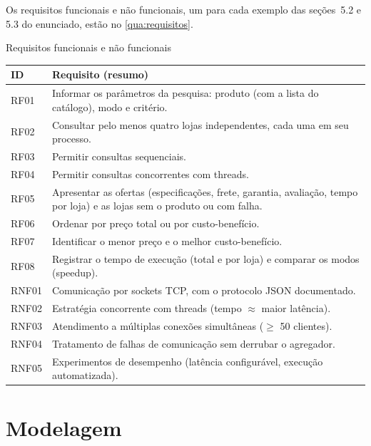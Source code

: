 Os requisitos funcionais e não funcionais, um para cada exemplo das seções~5.2 e 5.3 do enunciado, estão no \autoref{qua:requisitos}.

\begin{quadro}[!htbp]
  \centering\small
  \caption{Requisitos funcionais e não funcionais}\label{qua:requisitos}
  \begin{tabularx}{\textwidth}{|L{1.4cm}|Y|}
    \hline
    \textbf{ID} & \textbf{Requisito (resumo)} \\ \hline
    RF01 & Informar os parâmetros da pesquisa: produto (com a lista do catálogo), modo e critério. \\ \hline
    RF02 & Consultar pelo menos quatro lojas independentes, cada uma em seu processo. \\ \hline
    RF03 & Permitir consultas sequenciais. \\ \hline
    RF04 & Permitir consultas concorrentes com threads. \\ \hline
    RF05 & Apresentar as ofertas (especificações, frete, garantia, avaliação, tempo por loja) e as lojas sem o produto ou com falha. \\ \hline
    RF06 & Ordenar por preço total ou por custo-benefício. \\ \hline
    RF07 & Identificar o menor preço e o melhor custo-benefício. \\ \hline
    RF08 & Registrar o tempo de execução (total e por loja) e comparar os modos (speedup). \\ \hline
    RNF01 & Comunicação por sockets TCP, com o protocolo JSON documentado. \\ \hline
    RNF02 & Estratégia concorrente com threads (tempo $\approx$ maior latência). \\ \hline
    RNF03 & Atendimento a múltiplas conexões simultâneas ($\geq$ 50 clientes). \\ \hline
    RNF04 & Tratamento de falhas de comunicação sem derrubar o agregador. \\ \hline
    RNF05 & Experimentos de desempenho (latência configurável, execução automatizada). \\ \hline
  \end{tabularx}
  \fonteautores
\end{quadro}

\chapter{Modelagem}\label{cap:modelagem}


